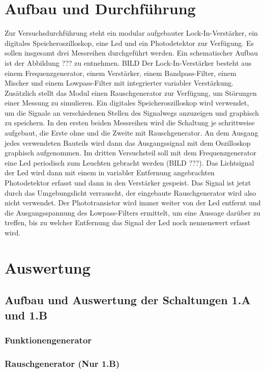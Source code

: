 \documentclass[11pt]{article}
\begin{document}
\section{Aufbau und Durchf\"{u}hrung}
Zur Versuchsdurchführung steht ein modular aufgebauter Lock-In-Verstärker, ein digitales Speicheroszilloskop, eine Led und ein Photodetektor zur Verfügung. Es sollen insgesamt drei Messreihen durchgeführt werden.
Ein schematischer Aufbau ist der Abbildung ??? zu entnehmen.\newline
BILD\newline
Der Lock-In-Verstärker besteht aus einem Frequenzgenerator, einem Verstärker, einem Bandpass-Filter, einem Mischer und einem Lowpass-Filter mit integrierter variabler Verstärkung. Zusätzlich stellt das Modul einen Rauschgenerator zur Verfügung, um Störungen einer Messung zu simulieren. Ein digitales Speicheroszilloskop wird verwendet, um die Signale an verschiedenen Stellen des Signalwegs anzuzeigen und graphisch zu speichern. In den ersten beiden Messreihen wird die Schaltung je schrittweise aufgebaut, die Erste ohne und die Zweite mit Rauschgenerator. An dem Ausgang jedes verwendeten Bauteils wird dann das Ausgangssignal mit dem Oszilloskop graphisch aufgenommen.\newline
Im dritten Versuchsteil soll mit dem Frequenzgenerator eine Led periodisch zum Leuchten gebracht werden (BILD ???). \newline
\newline
Das Lichtsignal der Led wird dann mit einem in variabler Entfernung angebrachten Photodetektor erfasst und dann in den Verstärker gespeist. Das Signal ist jetzt durch das Umgebungslicht verrauscht, der eingebaute Rauschgenerator wird also nicht verwendet. Der Phototransistor wird immer weiter von der Led entfernt und die Ausgangsspannung des Lowpass-Filters ermittelt, um eine Aussage darüber zu treffen, bis zu welcher Entfernung das Signal der Led noch nennenswert erfasst wird.
\section{Auswertung}
\subsection{Aufbau und Auswertung der Schaltungen 1.A und 1.B}
\subsubsection{Funktionengenerator}
\subsubsection{Rauschgenerator (Nur 1.B)}
\end{document}
